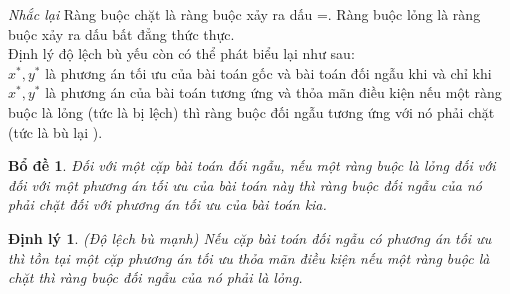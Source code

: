 \documentclass[12pt,a4paper]{report}
\newtheorem{dl}{Định lý}[chapter]
\newtheorem{bd}{Bổ đề}[chapter]
\begin{document}
    \textit{Nhắc lại} Ràng buộc chặt là ràng buộc xảy ra dấu =. Ràng buộc lỏng là ràng buộc xảy ra dấu bất đẳng thức thực.\\
    Định lý độ lệch bù yếu còn có thể phát biểu lại như sau:\\
    $x^*,y^*$ là phương án tối ưu của bài toán gốc và bài toán đối ngẫu khi và chỉ khi $x^*,y^*$ là phương án của bài toán tương ứng và thỏa mãn điều kiện nếu một ràng buộc là lỏng (tức là bị lệch) thì ràng buộc đối ngẫu tương ứng với nó phải chặt (tức là bù lại ).\\
    \begin{bd}
        Đối với một cặp bài toán đối ngẫu, nếu một ràng buộc là lỏng đối với đối với một phương án tối ưu của bài toán này thì ràng buộc đối ngẫu của nó phải chặt đối với phương án tối ưu của bài toán kia.\\
    \end{bd}
     \begin{dl}
        (Độ lệch bù mạnh) Nếu cặp bài toán đối ngẫu có phương án tối ưu thì tồn tại một cặp phương án tối ưu thỏa mãn điều kiện nếu một ràng buộc là chặt thì ràng buộc đối ngẫu của nó phải là lỏng.\\
        
    \end{dl}
\end{document}
